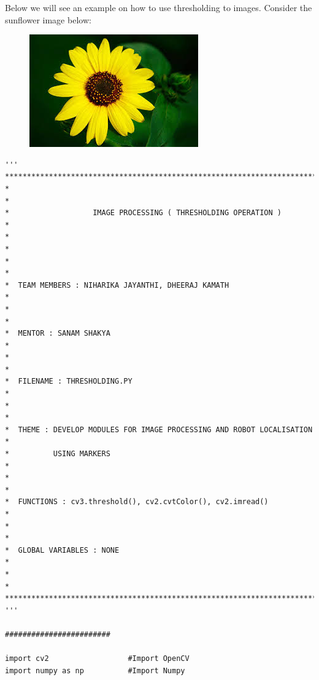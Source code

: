 \documentclass[]{article}
\begin{document}
Below we will see an example on how to use thresholding to images.
Consider the sunflower image below:
\begin{figure}[h]
	\includegraphics{sun.jpg}
\end{figure}

\newpage
\begin{verbatim}
'''
**********************************************************************************
*                                                                                *
*                   IMAGE PROCESSING ( THRESHOLDING OPERATION )                  *
*                                                                                *
*                                                                                *
*  TEAM MEMBERS : NIHARIKA JAYANTHI, DHEERAJ KAMATH                              *
*                                                                                *
*  MENTOR : SANAM SHAKYA                                                         *
*                                                                                *
*  FILENAME : THRESHOLDING.PY                                                    *
*                                                                                *
*  THEME : DEVELOP MODULES FOR IMAGE PROCESSING AND ROBOT LOCALISATION           * 
*          USING MARKERS                                                         *
*                                                                                *
*  FUNCTIONS : cv3.threshold(), cv2.cvtColor(), cv2.imread()                     *
*                                                                                *
*  GLOBAL VARIABLES : NONE                                                       *
*                                                                                *
**********************************************************************************
'''

########################

import cv2                  #Import OpenCV
import numpy as np          #Import Numpy


\end{verbatim}
\end{document}
